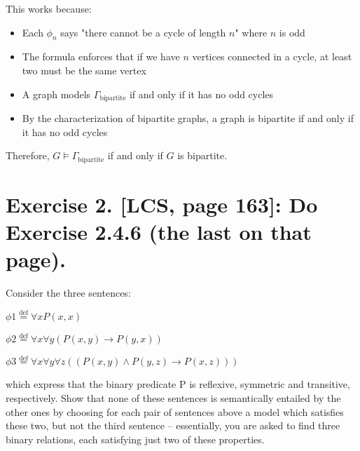 \documentclass{article}
\newenvironment{proof}
{\begin{mdframed}[linewidth=0.5pt]\begin{enumerate}[label=\arabic*.,leftmargin=*]}
{\end{enumerate}\end{mdframed}}
\newcommand{\defeq}{\stackrel{\text{def}}{=}}
\begin{document}
    This works because:
\begin{proof}
    
    \begin{itemize}
        \item Each $\phi_n$ says "there cannot be a cycle of length $n$" where $n$ is odd
        \item The formula enforces that if we have $n$ vertices connected in a cycle, at least two must be the same vertex
        \item A graph models $\Gamma_{\text{bipartite}}$ if and only if it has no odd cycles
        \item By the characterization of bipartite graphs, a graph is bipartite if and only if it has no odd cycles
    \end{itemize}
    
    Therefore, $G \models \Gamma_{\text{bipartite}}$ if and only if $G$ is bipartite.
\end{proof}


\newpage



\section*{Exercise 2. [LCS, page 163]: Do Exercise 2.4.6 (the last on that page).}

\begin{mdframed}
    Consider the three sentences:
    
    \vspace{1em}
    $\phi1 \defeq \forall x P (x, x)$
    
    \vspace{1em}
    $\phi2 \defeq \forall x \forall y (P (x, y) \rightarrow P (y, x))$
    
    \vspace{1em}
    $\phi3 \defeq \forall x \forall y \forall z ((P (x, y) \land P (y, z) \rightarrow P (x, z)))$
    
    \vspace{1em}

    which express that the binary predicate P is reﬂexive, symmetric and transitive,
    respectively. Show that none of these sentences is semantically entailed by the
    other ones by choosing for each pair of sentences above a model which satisﬁes
    these two, but not the third sentence – essentially, you are asked to ﬁnd three
    binary relations, each satisfying just two of these properties. 
  
\end{mdframed}
\end{document}
